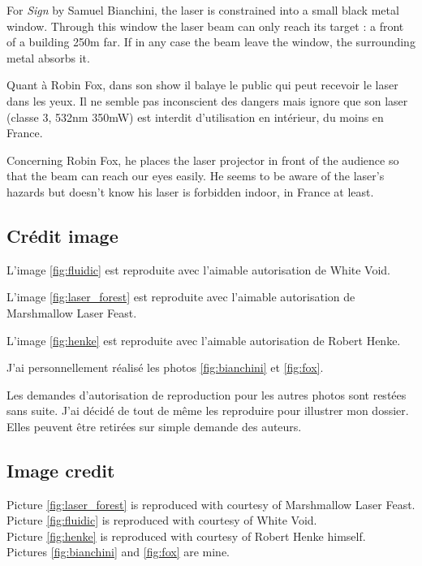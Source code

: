 \begin{appendices}
\begin{en}
For \textit{Sign} by Samuel Bianchini, the laser is constrained into a small black metal window.
Through this window the laser beam can only reach its target : a front of a building 250\unit{m} far.
If in any case the beam leave the window, the surrounding metal absorbs it.
\end{en}

\begin{fr}
Quant à Robin Fox, dans son show il balaye le public qui peut recevoir le laser dans les yeux.
Il ne semble pas inconscient des dangers mais ignore que son laser (classe 3, 532\unit{nm} 350\unit{mW}) est interdit d'utilisation en intérieur, du moins en France.
\end{fr}

\begin{en}
Concerning Robin Fox, he places the laser projector in front of the audience so that the beam can reach our eyes easily.
He seems to be aware of the laser's hazards but doesn't know his laser is forbidden indoor, in France at least.
\end{en}

\begin{fr}
\section{Crédit image}
        
L'image \ref{fig:fluidic} est reproduite avec l'aimable autorisation de White Void.

L'image \ref{fig:laser_forest} est reproduite avec l'aimable autorisation de Marshmallow Laser Feast.

L'image \ref{fig:henke}  est reproduite avec l'aimable autorisation de Robert Henke.

J'ai personnellement réalisé les photos \ref{fig:bianchini} et   \ref{fig:fox}.

Les demandes d'autorisation de reproduction pour les autres photos sont restées sans suite. 
J'ai décidé de tout de même les reproduire pour illustrer mon dossier.
Elles peuvent être retirées sur simple demande des auteurs.
\end{fr}

\begin{en}
        \section{Image credit}
        
        Picture \ref{fig:laser_forest} is reproduced with courtesy of Marshmallow Laser Feast. \\
        Picture \ref{fig:fluidic} is reproduced with courtesy of White Void. \\
        Picture  \ref{fig:henke} is reproduced with courtesy of Robert Henke himself. \\        
        Pictures \ref{fig:bianchini} and \ref{fig:fox} are mine. \\
        

\end{en}
\end{appendices}
